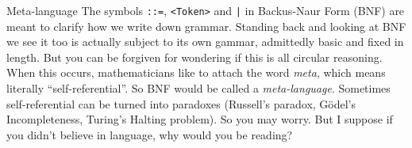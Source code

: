 \begin{remark}{Meta-language}
    The symbols \lstinline{::=}, \lstinline{<Token>} and \lstinline{|} in
    Backus-Naur Form (BNF) are meant to clarify how we write down grammar.
    Standing back and looking at BNF we see  it too is actually subject to its
    own gammar, admittedly basic and fixed in length.  But you can be forgiven
    for wondering if this is all circular reasoning.  When this occurs,
    mathematicians like to attach the word \emph{meta}, which means literally
    ``self-referential''. So BNF would be called a \emph{meta-language}.
    Sometimes self-referential can be turned into paradoxes (Russell's paradox,
    G\"odel's Incompleteness, Turing's Halting problem).  So you may worry.  But
    I suppose if you didn't believe in language, why would you be reading?\\
\end{remark}
